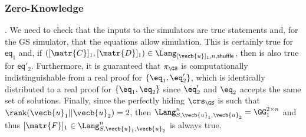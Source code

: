 \subsubsection{Zero-Knowledge}. We need to check that the inputs to the simulators are true statements and, for the GS simulator, that the equations allow simulation. This is certainly true for $\mathsf{eq}_1$ and, if $([\matr{C}]_1,[\matr{D}]_1)\in\Lang_{[\vecb{u}]_1,n,\mathsf{shuffle}}$, then is also true for $\mathsf{eq}'_2$. Furthermore, it is guaranteed that $\pi_\GS$ is computationally indistinguishable from a real proof for $\{\eq_1,\eq'_2\}$, which is identically distributed to a real proof for $\{\eq_1,\eq_2\}$ since $\eq'_2$ and $\eq_2$ accepts the same set of solutions.
Finally, since the perfectly hiding $\crs_\GS$ is such that $\rank(\vecb{u}_1||\vecb{u}_2)=2$, then $\Lang_{S,\vecb{u}_1,\vecb{u}_2}^n=\GG_1^{2\times n}$ and thus $[\matr{F}]_1\in\Lang_{S,\vecb{u}_1,\vecb{u}_2}^n$ is always true.
